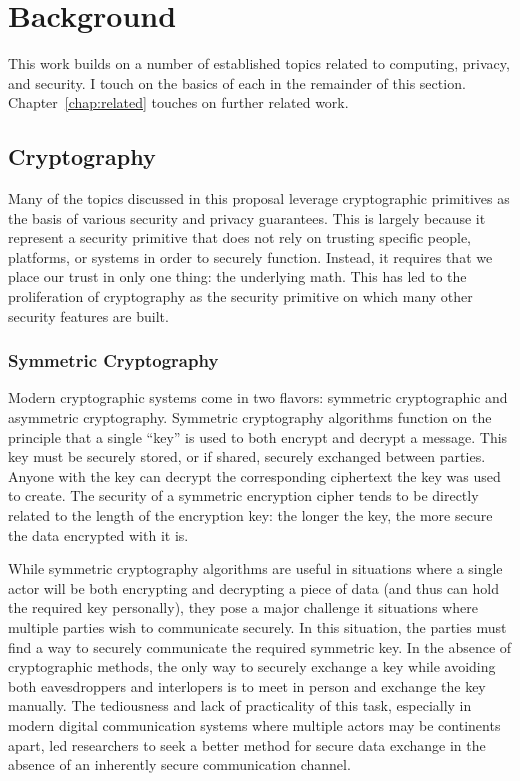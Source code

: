 \chapter{Background}
\label{chap:background}

This work builds on a number of established topics related to
computing, privacy, and security. I touch on the basics of each in the
remainder of this section. Chapter~\ref{chap:related} touches on
further related work.

\section{Cryptography}

Many of the topics discussed in this proposal leverage cryptographic
primitives as the basis of various security and privacy
guarantees. This is largely because it represent a security primitive
that does not rely on trusting specific people, platforms, or systems
in order to securely function. Instead, it requires that we place our
trust in only one thing: the underlying math. This has led to the
proliferation of cryptography as the security primitive on which many
other security features are built.

\subsection{Symmetric Cryptography}

Modern cryptographic systems come in two flavors: symmetric
cryptographic and asymmetric cryptography. Symmetric cryptography
algorithms function on the principle that a single ``key'' is used to
both encrypt and decrypt a message. This key must be securely stored,
or if shared, securely exchanged between parties. Anyone with the key
can decrypt the corresponding ciphertext the key was used to
create. The security of a symmetric encryption cipher tends to be
directly related to the length of the encryption key: the longer the
key, the more secure the data encrypted with it is.

While symmetric cryptography algorithms are useful in situations where
a single actor will be both encrypting and decrypting a piece of data
(and thus can hold the required key personally), they pose a major
challenge it situations where multiple parties wish to communicate
securely. In this situation, the parties must find a way to securely
communicate the required symmetric key. In the absence of
cryptographic methods, the only way to securely exchange a key while
avoiding both eavesdroppers and interlopers is to meet in person and
exchange the key manually. The tediousness and lack of practicality of
this task, especially in modern digital communication systems where
multiple actors may be continents apart, led researchers to seek a
better method for secure data exchange in the absence of an inherently
secure communication channel.

